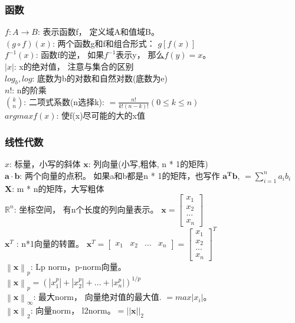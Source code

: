 \documentclass[11pt]{article}
\begin{document}
    \subsubsection{函数}\label{ux51fdux6570}

    \(f:A \rightarrow B\): 表示函数f， 定义域A和值域B。\\
\(\left(g \circ f \right)\left(x \right)\): 两个函数g和f和组合形式：
\(g[f(x)]\)\\
\(f^{-1}(x)\): 函数f的逆， 如果\(f^{-1}\)表示y， 那么\(f(y)=x\)。\\
\(|x|\): x的绝对值， 注意与集合的区别\\
\(log_{b}, log\): 底数为b的对数和自然对数(底数为e)\\
\(n!\): n的阶乘\\
\(\binom{k}{n}\): 二项式系数(n选择k):
\(= \frac{n!}{k!(n-k)!} (0\leq k\leq n)\)\\
\(arg max f(x)\): 使f(x)尽可能的大的x值

    \subsubsection{线性代数}\label{ux7ebfux6027ux4ee3ux6570}

    \(x\): 标量，小写的斜体 \(\mathbf{x}\): 列向量(小写,粗体, n * 1的矩阵)\\
\(\mathbf{a} \cdot \mathbf{b}\): 两个向量的点积。 如果a和b都是n *
1的矩阵，也写作 \(\mathbf{a}^{\boldsymbol{\mathbf{T}}} \mathbf{b}\),
\(=\sum_{i=1}^{n}a_{i}b_{i}\)\\
\(\mathbf{X}\): m * n的矩阵，大写粗体\\
\(\mathbb{R}^{n}\): 坐标空间， 有n个长度的列向量表示。
\(\mathbf{x} = \begin{bmatrix}x_{1}\\ x_{2}\\ ...\\ x_{n}\end{bmatrix}\)\\
\(\mathbf{x}^T\) : n*1向量的转置。
\(\mathbf{x}^{T} =\begin{bmatrix} x_{1}& x_{2}& ...& x_{n}\end{bmatrix} = \begin{bmatrix}x_{1}\\ x_{2}\\ ...\\ x_{n}\end{bmatrix}^{T}\)\\
\(\left \| \mathbf{x} \right \|_{p}\): Lp norm，p-norm向量。\\
\(\left \| \mathbf{x} \right \|_{p} = (|x_{1}^{p}| + |x_{2}^{p}| + ... + |x_{n}^{p}|)^{1/p}\)\\
\(\left \| \mathbf{x} \right \|_{\infty }\): 最大norm，
向量绝对值的最大值. \(=max|x_{i}|\)。\\
\(\left \| \mathbf{x} \right \|_{2}\): 向量norm，
l2norm。\(=||\mathbf{x}||_{2}\)
\end{document}
